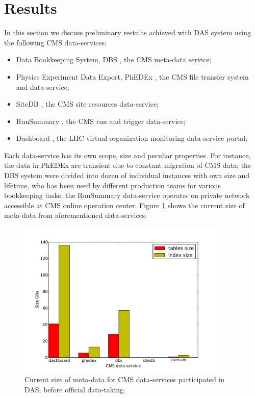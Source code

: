 \documentclass[a4paper]{jpconf}
\begin{document}
\section{Results\label{Results}}
In this section we discuss preliminary restults achieved with DAS system
using the following CMS data-services:
\begin{itemize}
\item Data Bookkeeping System, DBS \cite{DBS}, the CMS meta-data service;
\item Physics Experiment Data Export, PhEDEx \cite {PhEDEx}, the 
CMS file transfer system and data-service;
\item SiteDB \cite{SiteDB}, the CMS site resources data-service;
\item RunSummary \cite{RunSummary}, the CMS run and trigger data-service;
\item Dashboard \cite{Dashboard}, the LHC virtual organization
monitoring data-service portal;
\end{itemize}
Each data-service has its own scope, size and peculiar properties. 
For instance, the data in PhEDEx are transient due to constant 
migration of CMS data; the DBS system were divided into dozen 
of individual instances with own size and lifetime, who has been used by different production 
teams for various bookkeeping tasks; the RunSummary data-service
operates on private network accessible at CMS online operation center.
Figure \ref{db_size} shows the current size of meta-data from aforementioned 
data-services.
\begin{figure}[htb]
\centering
\includegraphics[width=100mm]{db_size.pdf}
\caption{
Current size of meta-data for CMS data-services participated in DAS, before
official data-taking. 
}
\label{db_size}
\end{figure}
\end{document}
